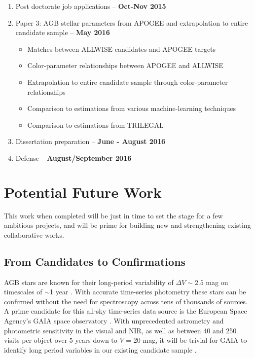 \begin{enumerate}
\item Post doctorate job applications -- \textbf{Oct-Nov 2015}
\item Paper 3: AGB stellar parameters from APOGEE and extrapolation to entire candidate sample -- \textbf{May 2016}
	\begin{itemize}
		\item Matches between ALLWISE candidates and APOGEE targets
		\item Color-parameter relationships between APOGEE and ALLWISE
		\item Extrapolation to entire candidate sample through color-parameter relationships
		\item Comparison to estimations from various machine-learning techniques
		\item Comparison to estimations from TRILEGAL
	\end{itemize}
\item Dissertation preparation -- \textbf{June - August 2016}
\item Defense -- \textbf{August/September 2016}
\end{enumerate}

\section{Potential Future Work}
This work when completed will be just in time to set the stage for a few ambitious projects, and will be prime for building new and strengthening existing collaborative works.
\subsection{From Candidates to Confirmations}
AGB stars are known for their long-period variability of $\Delta V\sim2.5$ mag on timescales of $\sim$1 year \citep{2000PASA...17...18W, 2008PhDT.........6F}. With accurate time-series photometry these stars can be confirmed without the need for spectroscopy across tens of thousands of sources. A prime candidate for this all-sky time-series data source is the European Space Agency's GAIA space observatory \citep{2001A&A...369..339P,2002MNRAS.331..649B}. With unprecedented astrometry and photometric sensitivity in the visual and NIR, as well as between 40 and 250 visits per object over 5 years down to $V$ = 20 mag, it will be trivial for GAIA to identify long period variables in our existing candidate sample \citep{2000ASPC..203...71E}.

